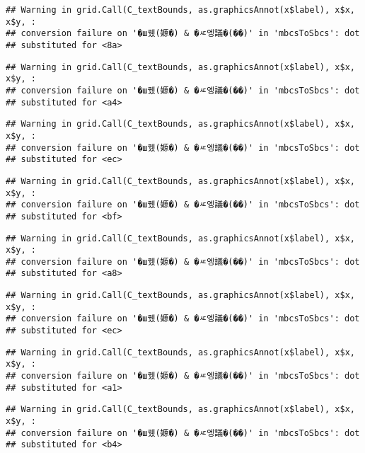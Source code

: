 \documentclass[
]{article}
\begin{document}
\begin{verbatim}
## Warning in grid.Call(C_textBounds, as.graphicsAnnot(x$label), x$x, x$y, :
## conversion failure on '�ш퀬(嫄�) & �ㅼ엥議�(��)' in 'mbcsToSbcs': dot
## substituted for <8a>
\end{verbatim}

\begin{verbatim}
## Warning in grid.Call(C_textBounds, as.graphicsAnnot(x$label), x$x, x$y, :
## conversion failure on '�ш퀬(嫄�) & �ㅼ엥議�(��)' in 'mbcsToSbcs': dot
## substituted for <a4>
\end{verbatim}

\begin{verbatim}
## Warning in grid.Call(C_textBounds, as.graphicsAnnot(x$label), x$x, x$y, :
## conversion failure on '�ш퀬(嫄�) & �ㅼ엥議�(��)' in 'mbcsToSbcs': dot
## substituted for <ec>
\end{verbatim}

\begin{verbatim}
## Warning in grid.Call(C_textBounds, as.graphicsAnnot(x$label), x$x, x$y, :
## conversion failure on '�ш퀬(嫄�) & �ㅼ엥議�(��)' in 'mbcsToSbcs': dot
## substituted for <bf>
\end{verbatim}

\begin{verbatim}
## Warning in grid.Call(C_textBounds, as.graphicsAnnot(x$label), x$x, x$y, :
## conversion failure on '�ш퀬(嫄�) & �ㅼ엥議�(��)' in 'mbcsToSbcs': dot
## substituted for <a8>
\end{verbatim}

\begin{verbatim}
## Warning in grid.Call(C_textBounds, as.graphicsAnnot(x$label), x$x, x$y, :
## conversion failure on '�ш퀬(嫄�) & �ㅼ엥議�(��)' in 'mbcsToSbcs': dot
## substituted for <ec>
\end{verbatim}

\begin{verbatim}
## Warning in grid.Call(C_textBounds, as.graphicsAnnot(x$label), x$x, x$y, :
## conversion failure on '�ш퀬(嫄�) & �ㅼ엥議�(��)' in 'mbcsToSbcs': dot
## substituted for <a1>
\end{verbatim}

\begin{verbatim}
## Warning in grid.Call(C_textBounds, as.graphicsAnnot(x$label), x$x, x$y, :
## conversion failure on '�ш퀬(嫄�) & �ㅼ엥議�(��)' in 'mbcsToSbcs': dot
## substituted for <b4>
\end{verbatim}
\end{document}
